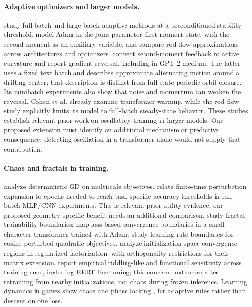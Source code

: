 \documentclass[11pt,letterpaper]{article}
\begin{document}
\paragraph{Adaptive optimizers and larger models.} \citet{cohenadaptive2022} study full-batch and large-batch
adaptive methods at a preconditioned stability threshold. \citet{regischewi2026} model Adam in the joint
parameter--first-moment state, with the second moment as an auxiliary variable, and compare rod-flow
approximations across architectures and optimizers. \citet{fongyang2026} connect second-moment feedback to
active curvature and report gradient reversal, including in GPT-2 medium. The latter uses a fixed text batch
and describes approximate alternating motion around a drifting center; that description is distinct from
full-state periodic-orbit closure. Its minibatch experiments also show that noise and momentum can weaken
the reversal. Cohen et al. already examine transformer warmup, while the rod-flow study explicitly limits
its model to full-batch steady-state behavior. These studies establish relevant
prior work on oscillatory training in larger models. Our proposed extension must identify an additional
mechanism or predictive consequence; detecting oscillation in a transformer alone would not supply that contribution.

\paragraph{Chaos and fractals in training.} \citet{kong2020} analyze deterministic GD on multiscale objectives.
\citet{jimenez2026} relate finite-time perturbation expansion to epochs needed to reach task-specific accuracy
thresholds in full-batch MLP/CNN experiments. This is relevant prior utility evidence; our proposed geometry-specific
benefit needs an additional comparison. \citet{sohldickstein2024} study fractal trainability boundaries;
\citet{torkamandi2025} map loss-based convergence boundaries in a small character transformer trained with Adam;
\citet{liu2024} study learning-rate boundaries for cosine-perturbed quadratic objectives.
\citet{liang2026} analyze initialization-space convergence regions in regularized factorization, with
orthogonality restrictions for their matrix extension. \citet{ly2025} report empirical riddling-like and
functional sensitivity across training runs, including BERT fine-tuning; this concerns outcomes after
retraining from nearby initializations, not chaos during frozen inference. Learning dynamics in
games show chaos \citep{sato2002} and phase locking \citep{metaxas2026}, for adaptive rules rather than descent on
one loss.
\end{document}
